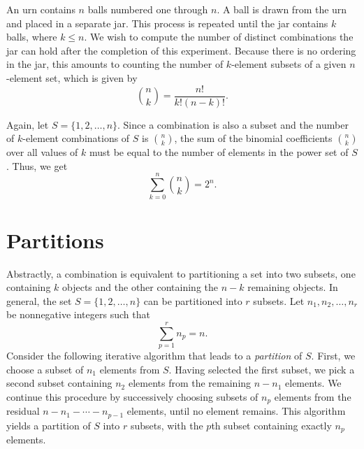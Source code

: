 \begin{example}
An urn contains $n$ balls numbered one through $n$.
A ball is drawn from the urn and placed in a separate jar.
This process is repeated until the jar contains $k$ balls, where $k \leq n$.
We wish to compute the number of distinct combinations the jar can hold after the completion of this experiment.
Because there is no ordering in the jar, this amounts to counting the number of $k$-element subsets of a given $n$-element set, which is given by
\begin{equation*}
\binom{n}{k} = \frac{n!}{k! (n-k)!}.
\end{equation*}
\end{example}

Again, let $S = \{1, 2, \ldots, n\}$.
Since a combination is also a subset and the number of $k$-element combinations of $S$ is $\binom{n}{k}$, the sum of the binomial coefficients $\binom{n}{k}$ over all values of $k$ must be equal to the number of elements in the power set of $S$.
Thus, we get
\begin{equation*}
\sum_{k=0}^n \binom{n}{k} = 2^n .
\end{equation*}


\section{Partitions}

Abstractly, a combination is equivalent to partitioning a set into two subsets, one containing $k$ objects and the other containing the $n-k$ remaining objects.
In general, the set $S = \{ 1, 2, \ldots, n \}$ can be partitioned into $r$ subsets.
Let $n_1, n_2, \ldots, n_r$ be nonnegative integers such that
\begin{equation*}
\sum_{p = 1}^r n_p = n.
\end{equation*}
Consider the following iterative algorithm that leads to a \emph{partition} of $S$. 
First, we choose a subset of $n_1$ elements from $S$.
Having selected the first subset, we pick a second subset containing $n_2$ elements from the remaining $n - n_1$ elements.
We continue this procedure by successively choosing subsets of $n_p$ elements from the residual $n - n_1 - \cdots - n_{p-1}$ elements, until no element remains.
This algorithm yields a partition of $S$ into $r$ subsets, with the $p$th subset containing exactly $n_p$ elements.

